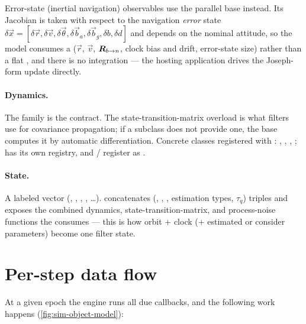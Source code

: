 Error-state (inertial navigation) observables use the parallel
 base instead. Its Jacobian is taken with respect to
the navigation \emph{error} state
$\delta\vec{x} = [\delta\vec{r}, \delta\vec{v}, \delta\vec{\theta},
\delta\vec{b}_a, \delta\vec{b}_g, \delta b, \delta d]$ and depends on the nominal
attitude, so the model consumes a 
($\vec{r}$, $\vec{v}$, $\bm{R}_{b \to n}$, clock bias and drift, error-state
size) rather than a flat , and there is no  integration ---
the hosting application drives the Joseph-form update directly.

\paragraph{Dynamics.} The  family is the contract. The
state-transition-matrix overload is what filters use for covariance propagation;
if a subclass does not provide one, the base computes it by automatic
differentiation. Concrete classes registered with :
, , ,
;  has its own registry, and
 /  register as
.

\paragraph{State.} A labeled vector (, ,
, , \dots).  concatenates
(, , , estimation types, $\tau_q$) triples
and exposes the combined dynamics, state-transition-matrix, and process-noise
functions the  consumes --- this is how orbit $+$ clock ($+$ estimated
or consider parameters) become one filter state.

\section{Per-step data flow}
\label{sec:sim-dataflow}

At a given epoch the engine runs all due callbacks, and the following work
happens (\cref{fig:sim-object-model}):

